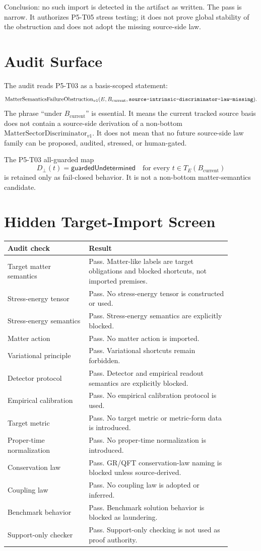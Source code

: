 \documentclass[11pt]{article}
\newcommand{\MatterDisc}{\mathrm{MatterSectorDiscriminator}_{v1}}
\newcommand{\Obstruction}{\mathrm{MatterSemanticsFailureObstruction}_{v1}}
\newcommand{\Bcur}{B_{\mathrm{current}}}
\newcommand{\Dbot}{D_{\bot}}
\begin{document}
Conclusion: no such import is detected in the artifact as written. The pass is
narrow. It authorizes P5-T05 stress testing; it does not prove global
stability of the obstruction and does not adopt the missing source-side law.

\section{Audit Surface}

The audit reads P5-T03 as a basis-scoped statement:
\[
  \Obstruction(E,\Bcur,
  \texttt{source\mbox{-}intrinsic\mbox{-}discriminator\mbox{-}law\mbox{-}missing}).
\]
The phrase ``under \(\Bcur\)'' is essential. It means the current tracked
source basis does not contain a source-side derivation of a non-bottom
\(\MatterDisc\). It does not mean that no future source-side law family can be
proposed, audited, stressed, or human-gated.

The P5-T03 all-guarded map
\[
  \Dbot(t)=\mathsf{guardedUndetermined}
  \quad\text{for every }t\in T_E(\Bcur)
\]
is retained only as fail-closed behavior. It is not a non-bottom
matter-semantics candidate.

\section{Hidden Target-Import Screen}

\begin{longtable}{p{0.32\linewidth}p{0.56\linewidth}}
\toprule
Audit check & Result \\
\midrule
Target matter semantics & Pass. Matter-like labels are target obligations and blocked shortcuts, not imported premises. \\
Stress-energy tensor & Pass. No stress-energy tensor is constructed or used. \\
Stress-energy semantics & Pass. Stress-energy semantics are explicitly blocked. \\
Matter action & Pass. No matter action is imported. \\
Variational principle & Pass. Variational shortcuts remain forbidden. \\
Detector protocol & Pass. Detector and empirical readout semantics are explicitly blocked. \\
Empirical calibration & Pass. No empirical calibration protocol is used. \\
Target metric & Pass. No target metric or metric-form data is introduced. \\
Proper-time normalization & Pass. No proper-time normalization is introduced. \\
Conservation law & Pass. GR/QFT conservation-law naming is blocked unless source-derived. \\
Coupling law & Pass. No coupling law is adopted or inferred. \\
Benchmark behavior & Pass. Benchmark solution behavior is blocked as laundering. \\
Support-only checker & Pass. Support-only checking is not used as proof authority. \\
\bottomrule
\end{longtable}
\end{document}
